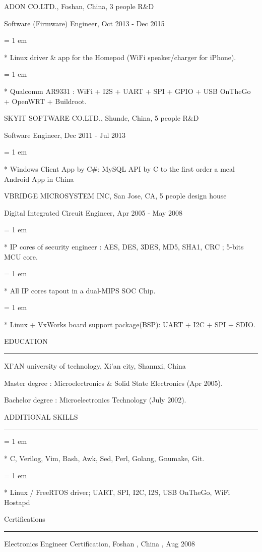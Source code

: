 { \medbreak } { \FFbg
ADON CO.LTD., Foshan, China, 3 people R\&D
}

{ \FFte
Software (Firmware) Engineer, Oct 2013 - Dec 2015
}
{ \parindent = 1 em \item{*}
 Linux driver \& app for the Homepod (WiFi speaker/charger for iPhone). 
}
{ \parindent = 1 em \item{*}
 Qualcomm AR9331 : WiFi + I2S + UART + SPI + GPIO + USB OnTheGo + OpenWRT + Buildroot.
 }

{ \medbreak } { \FFbg
SKYIT SOFTWARE CO.LTD., Shunde, China, 5 people R\&D
}

{ \FFte
Software Engineer, Dec 2011 - Jul 2013
}
{ \parindent = 1 em \item{*}
 Windows Client App by C\#; MySQL API by C to the first order a meal Android App in China
 }

{ \medbreak } { \FFbg
VBRIDGE MICROSYSTEM INC, San Jose, CA, 5 people design house
}

{ \FFte
Digital Integrated Circuit Engineer, Apr 2005 - May 2008
}
{ \parindent = 1 em \item{*}
 IP cores of security engineer :
 AES, DES, 3DES, MD5, SHA1, CRC ;
 5-bits MCU core.
 }
{ \parindent = 1 em \item{*}
All IP cores tapout in a dual-MIPS SOC Chip.
 }
{ \parindent = 1 em \item{*}
Linux + VxWorks board support package(BSP): UART + I2C + SPI + SDIO.
 }

{ \medbreak } { \FFbg
EDUCATION
}
{ \smallbreak } {\par\noindent\hrule} { \smallbreak }
XI'AN university of technology, Xi'an city, Shannxi, China

{ \FFte
Master degree : Microelectronics \& Solid State Electronics (Apr 2005).
}

{ \FFte
Bachelor degree : Microelectronics Technology (July 2002).
}

{ \medbreak } { \FFbg
ADDITIONAL SKILLS
}
{ \smallbreak } {\par\noindent\hrule} { \smallbreak }
{ \parindent = 1 em \item{*}
 C, Verilog, Vim, Bash, Awk, Sed, Perl, Golang, Gnumake, Git.
 }
{ \parindent = 1 em \item{*}
 Linux / FreeRTOS driver; UART, SPI, I2C, I2S, USB OnTheGo, WiFi Hostapd
 }

{ \medbreak } { \FFbg
Certifications
}
{ \smallbreak } {\par\noindent\hrule} { \smallbreak }
Electronics Engineer Certification, Foshan , China , Aug 2008

